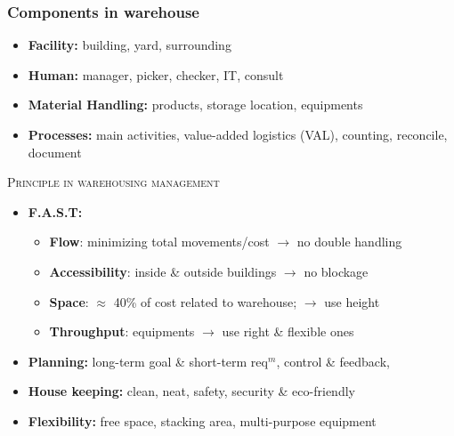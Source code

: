 \documentclass[10pt,handout,notes=show]{beamer}
\begin{document}
\begin{frame}
  \frametitle{Components in warehouse}

  \begin{itemize}
      \item \textbf{Facility:} building, yard, surrounding
      \item \textbf{Human:} manager, picker, checker, IT, consult
      \item \textbf{Material Handling:} products, \alert{storage location}, equipments
      \item \textbf{Processes:} \alert{main activities}, value-added logistics (VAL), counting, reconcile, document
  \end{itemize}

  \NextHalfLine
  \textsc{Principle in warehousing management}
    \begin{itemize}
      \item \textbf{F.A.S.T:}
      \begin{itemize}
        \item \textbf{Flow}: minimizing total movements/cost \alert<2->{ $\rightarrow$ no double handling}
        \item \textbf{Accessibility}: inside \& outside buildings \alert<2->{ $\rightarrow$ no blockage}
        \item \textbf{Space}: $\approx$ 40\% of cost related to warehouse; \alert<2->{ $\rightarrow$ use height}
        \item \textbf{Throughput}: equipments \alert<2->{ $\rightarrow$ use right \& flexible ones}
      \end{itemize}
      \item \textbf{Planning:} long-term goal \& short-term req$^m$, control \& feedback,
      \item \textbf{House keeping:} clean, neat, safety, security \& eco-friendly
      \item \textbf{Flexibility:} free space, stacking area, multi-purpose equipment
    \end{itemize}

\end{frame}
\end{document}
